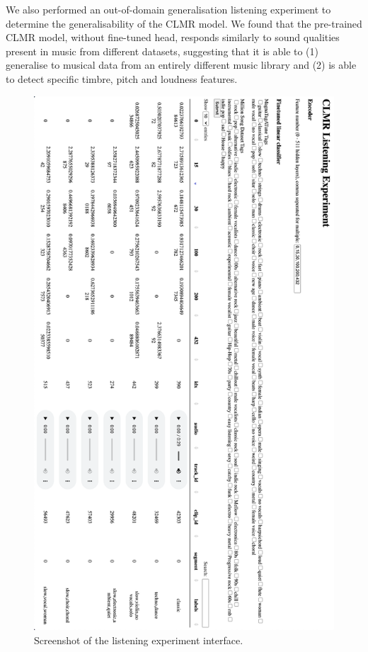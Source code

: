 We also performed an out-of-domain generalisation listening experiment to determine the generalisability of the CLMR model. We found that the pre-trained CLMR model, without fine-tuned head, responds similarly to sound qualities present in music from different datasets, suggesting that it is able to (1) generalise to musical data from an entirely different music library and (2) is able to detect specific timbre, pitch and loudness features.

\begin{figure}[h]
    \centering
    \includegraphics[width=\textwidth]{figs/listening_experiment.png}
    \caption{Screenshot of the listening experiment interface.}
    \label{fig:listening_experiment}
\end{figure}


